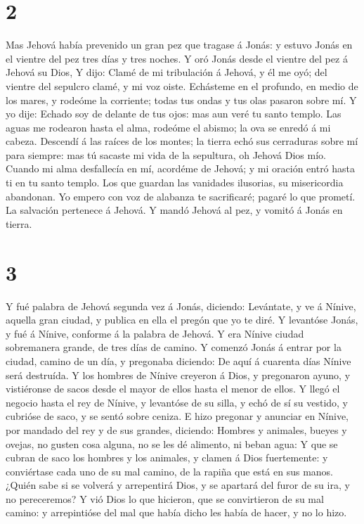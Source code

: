\hypertarget{section-1}{%
\section{2}\label{section-1}}

 Mas Jehová había prevenido un gran pez que tragase á
Jonás: y estuvo Jonás en el vientre del pez tres días y tres noches.
 Y oró Jonás desde el vientre del pez á Jehová su Dios,
 Y dijo: Clamé de mi tribulación á Jehová, y él me oyó;
del vientre del sepulcro clamé, y mi voz oiste.  Echásteme
en el profundo, en medio de los mares, y rodeóme la corriente; todas tus
ondas y tus olas pasaron sobre mí.  Y yo dije: Echado soy
de delante de tus ojos: mas aun veré tu santo templo.  Las
aguas me rodearon hasta el alma, rodeóme el abismo; la ova se enredó á
mi cabeza.  Descendí á las raíces de los montes; la tierra
echó sus cerraduras sobre mí para siempre: mas tú sacaste mi vida de la
sepultura, oh Jehová Dios mío.  Cuando mi alma desfallecía
en mí, acordéme de Jehová; y mi oración entró hasta ti en tu santo
templo.  Los que guardan las vanidades ilusorias, su
misericordia abandonan.  Yo empero con voz de alabanza te
sacrificaré; pagaré lo que prometí. La salvación pertenece á Jehová. Y
mandó Jehová al pez, y vomitó á Jonás en tierra.

\hypertarget{section-2}{%
\section{3}\label{section-2}}

 Y fué palabra de Jehová segunda vez á Jonás, diciendo:
 Levántate, y ve á Nínive, aquella gran ciudad, y publica
en ella el pregón que yo te diré.  Y levantóse Jonás, y
fué á Nínive, conforme á la palabra de Jehová. Y era Nínive ciudad
sobremanera grande, de tres días de camino.  Y comenzó
Jonás á entrar por la ciudad, camino de un día, y pregonaba diciendo: De
aquí á cuarenta días Nínive será destruída.  Y los hombres
de Nínive creyeron á Dios, y pregonaron ayuno, y vistiéronse de sacos
desde el mayor de ellos hasta el menor de ellos.  Y llegó
el negocio hasta el rey de Nínive, y levantóse de su silla, y echó de sí
su vestido, y cubrióse de saco, y se sentó sobre ceniza. 
E hizo pregonar y anunciar en Nínive, por mandado del rey y de sus
grandes, diciendo: Hombres y animales, bueyes y ovejas, no gusten cosa
alguna, no se les dé alimento, ni beban agua:  Y que se
cubran de saco los hombres y los animales, y clamen á Dios fuertemente:
y conviértase cada uno de su mal camino, de la rapiña que está en sus
manos.  ¿Quién sabe si se volverá y arrepentirá Dios, y se
apartará del furor de su ira, y no pereceremos?  Y vió
Dios lo que hicieron, que se convirtieron de su mal camino: y
arrepintióse del mal que había dicho les había de hacer, y no lo hizo.

